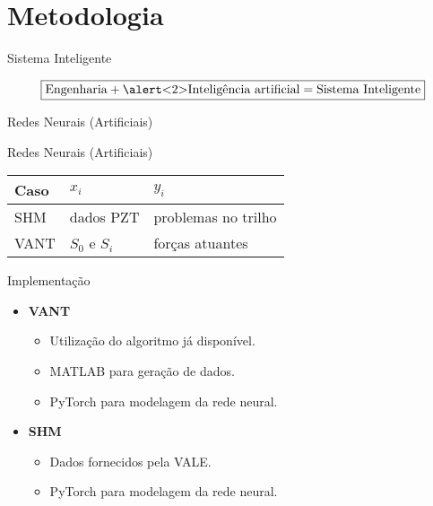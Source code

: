 \section{Metodologia}

\begin{frame}{Sistema Inteligente}

    \[\boxed{\text{Engenharia} + \text{\alert<2>{Inteligência artificial}}  = \text{Sistema Inteligente}}\] 
\end{frame}

\begin{frame}{Redes Neurais (Artificiais)}
\pause
\begin{figure}
\centering

\end{figure}
\end{frame}

\begin{frame}{Redes Neurais (Artificiais)}
\begin{table}
\centering
\begin{tabular}{|l|l|l|}
    \hline
    Caso & \(x_i\)           & \(y_i\)             \\ \hline
    SHM  & dados PZT         & \alert<4>{problemas no trilho} \\ \hline
    VANT & \(S_0\) e \(S_i\) & forças atuantes     \\ \hline
\end{tabular}
\end{table}
\end{frame}

\begin{frame}{Implementação}
\pause
\begin{itemize}
    \item \textbf{VANT}
        \begin{itemize}
            \item<3-> Utilização do algoritmo já disponível.
            \item<3-> MATLAB para geração de dados.
            \item<3-> PyTorch para modelagem da rede neural.
        \end{itemize}
    \item \textbf{SHM}
    \begin{itemize}
        \item<4> Dados fornecidos pela VALE.
        \item<4> PyTorch para modelagem da rede neural.
    \end{itemize}
\end{itemize}
    
\end{frame}
